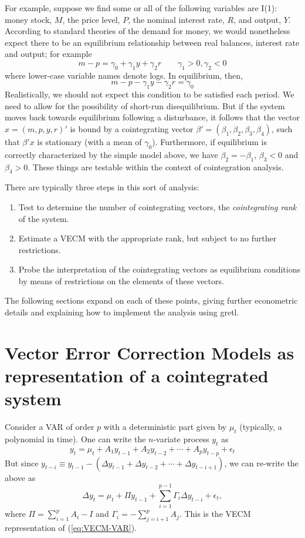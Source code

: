 For example, suppose we find some or all of the following variables
are I(1): money stock, $M$, the price level, $P$, the nominal interest
rate, $R$, and output, $Y$.  According to standard theories of the
demand for money, we would nonetheless expect there to be an
equilibrium relationship between real balances, interest rate and
output; for example
\[
m - p = \gamma_0 + \gamma_1 y + \gamma_2 r \qquad \gamma_1 > 0,
\gamma_2 < 0
\]
where lower-case variable names denote logs.  In equilibrium, then,
\[
m - p - \gamma_1 y - \gamma_2 r = \gamma_0
\]
Realistically, we should not expect this condition to be satisfied
each period.  We need to allow for the possibility of short-run
disequilibrium.  But if the system moves back towards equilibrium
following a disturbance, it follows that the vector $x = (m, p, y,
r)'$ is bound by a cointegrating vector $\beta' = (\beta_1, \beta_2,
\beta_3, \beta_4)$, such that $\beta'x$ is stationary (with a mean of
$\gamma_0$).  Furthermore, if equilibrium is correctly characterized
by the simple model above, we have $\beta_2 = -\beta_1$, $\beta_3 < 0$
and $\beta_4 > 0$.  These things are testable within the context of
cointegration analysis.

There are typically three steps in this sort of analysis:
\begin{enumerate}
\item Test to determine the number of cointegrating vectors, the 
  \emph{cointegrating rank} of the system.
\item Estimate a VECM with the appropriate rank, but subject to no
  further restrictions.
\item Probe the interpretation of the cointegrating vectors as
  equilibrium conditions by means of restrictions on the elements
  of these vectors.
\end{enumerate}

The following sections expand on each of these points, giving further
econometric details and explaining how to implement the analysis using
gretl.


\section{Vector Error Correction Models as representation of a
  cointegrated system}
\label{sec:VECM-rep}

Consider a VAR of order $p$ with a deterministic part given by $\mu_t$
(typically, a polynomial in time). One can write the $n$-variate
process $y_t$ as
\begin{equation}
  \label{eq:VECM-VAR}
  y_t = \mu_t + A_1 y_{t-1} + A_2 y_{t-2} + \cdots + A_p y_{t-p} +
  \epsilon_t 
\end{equation}
But since $y_{t-i} \equiv y_{t-1} - (\Delta y_{t-1} + \Delta y_{t-2} +
\cdots + \Delta y_{t-i+1})$, we can re-write the above as
\begin{equation}
  \label{eq:VECM}
  \Delta y_t = \mu_t + \Pi y_{t-1} + \sum_{i=1}^{p-1} \Gamma_i \Delta
  y_{t-i} + \epsilon_t ,
\end{equation}
where $\Pi = \sum_{i=1}^p A_i - I$ and $\Gamma_i = -\sum_{j=i+1}^p A_j$.
This is the VECM representation of (\ref{eq:VECM-VAR}).

